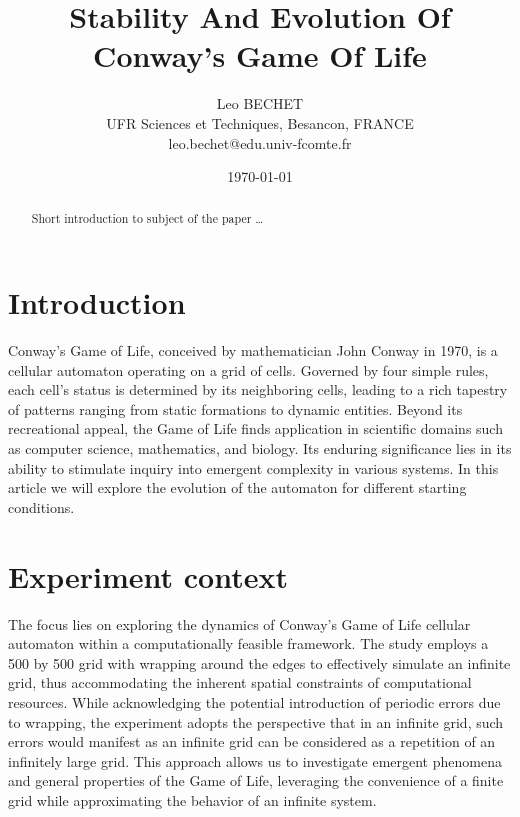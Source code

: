 \documentclass{article}
\title{Stability And Evolution Of Conway's Game Of Life}
\author{Leo BECHET  \\
UFR Sciences et Techniques, Besancon, FRANCE \\
leo.bechet@edu.univ-fcomte.fr
	}
\date{\today}
\begin{document}
\maketitle


\begin{abstract}
Short introduction to subject of the paper \ldots 
\end{abstract}

\section{Introduction}
Conway's Game of Life, conceived by mathematician John Conway in 1970, 
is a cellular automaton operating on a grid of cells. Governed by four 
simple rules, each cell's status is determined by its neighboring cells, 
leading to a rich tapestry of patterns ranging from static formations to 
dynamic entities. Beyond its recreational appeal, the Game of Life finds 
application in scientific domains such as computer science, mathematics, 
and biology. Its enduring significance lies in its ability to stimulate 
inquiry into emergent complexity in various systems. In this article we 
will explore the evolution of the automaton for different starting
conditions.





\section{Experiment context}
The focus lies on exploring the dynamics 
of Conway's Game of Life cellular automaton within a computationally 
feasible framework. The study employs a 500 by 500 grid with wrapping 
around the edges to effectively simulate an infinite grid, thus 
accommodating the inherent spatial constraints of computational 
resources. While acknowledging the potential introduction of periodic 
errors due to wrapping, the experiment adopts the perspective that in 
an infinite grid, such errors would manifest as an infinite grid can be considered as a repetition 
of an infinitely large grid. This approach allows us to 
investigate emergent phenomena and general properties of the Game of 
Life, leveraging the convenience of a finite grid while approximating 
the behavior of an infinite system. 
\end{document}
